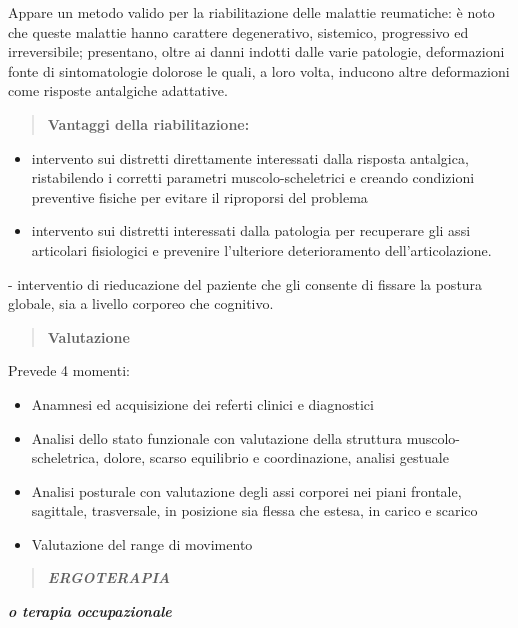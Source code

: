 \documentclass[]{article}
\begin{document}
Appare un metodo valido per la riabilitazione delle malattie reumatiche:
è noto che queste malattie hanno carattere degenerativo, sistemico,
progressivo ed irreversibile; presentano, oltre ai danni indotti dalle
varie patologie, deformazioni fonte di sintomatologie dolorose le quali,
a loro volta, inducono altre deformazioni come risposte antalgiche
adattative.

\begin{quote}
\textbf{Vantaggi della riabilitazione:}
\end{quote}

\begin{itemize}
\item
  intervento sui distretti direttamente interessati dalla risposta
  antalgica, ristabilendo i corretti parametri muscolo-scheletrici e
  creando condizioni preventive fisiche per evitare il riproporsi del
  problema
\item
  intervento sui distretti interessati dalla patologia per recuperare
  gli assi articolari fisiologici e prevenire l'ulteriore deterioramento
  dell'articolazione.
\end{itemize}

- interventio di rieducazione del paziente che gli consente di fissare
la postura globale, sia a livello corporeo che cognitivo.

\begin{quote}
\textbf{Valutazione}
\end{quote}

Prevede 4 momenti:

\begin{itemize}
\item
  Anamnesi ed acquisizione dei referti clinici e diagnostici
\item
  Analisi dello stato funzionale con valutazione della struttura
  muscolo-scheletrica, dolore, scarso equilibrio e coordinazione,
  analisi gestuale
\item
  Analisi posturale con valutazione degli assi corporei nei piani
  frontale, sagittale, trasversale, in posizione sia flessa che estesa,
  in carico e scarico
\item
  Valutazione del range di movimento
\end{itemize}

\begin{quote}
\textbf{\emph{ERGOTERAPIA}}
\end{quote}

\textbf{\emph{o terapia occupazionale}}
\end{document}
